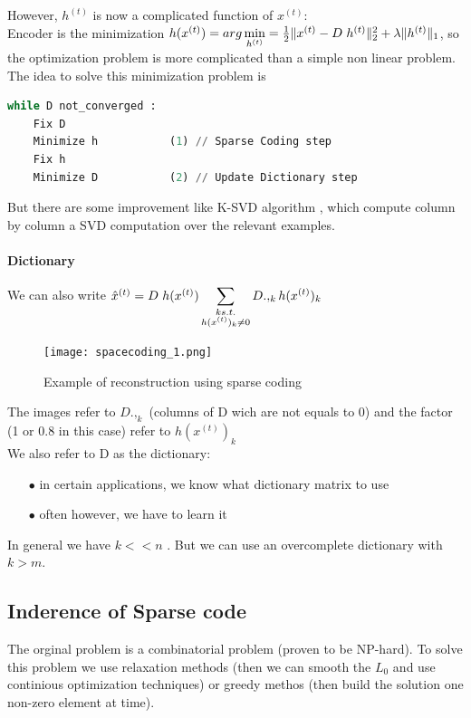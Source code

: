 \documentclass[a4paper,10pt]{article}
\begin{document}
However, $h^{(t)}$ is now a complicated function of $x^{(t)}$:\\
Encoder is the minimization $h(x^{(t)}) = arg\min\limits_{h^{(t)}}= \frac{1}{2} \| x^{(t)} - D \hspace{3px} h^{(t)} \|_2^2 + \lambda \|h^{(t)} \|_1$, so the optimization problem is more complicated than a simple non linear problem.\\
The idea to solve this minimization problem is \cite{NIPS2006_2979}

\begin{lstlisting}[language=Python,frame=single]
while D not_converged :
    Fix D
    Minimize h           (1) // Sparse Coding step
    Fix h 
    Minimize D           (2) // Update Dictionary step
\end{lstlisting}

But there are some improvement like K-SVD algorithm \cite{KSVD}, which compute column by column a SVD computation over the relevant examples.
\paragraph{Dictionary}
We can also write $\hat{x}^{(t)} = D\hspace{3px} h(x^{(t)}) \displaystyle\sum_{\substack{k s.t.\\ h(x^{(t)})_k\neq 0}}  D.,_k h(x^{(t)} )_k$
\begin{figure}[h]
 \centering
 \texttt{[image: spacecoding\_1.png]}
  \caption{Example of reconstruction using sparse coding}
\end{figure}

The images refer to $D.,_k$ (columns of D wich are not equals to 0) and the factor (1 or 0.8 in this case) refer to $h(x^{(t)} )_k$
\\We also refer to D as the dictionary:
\begin{itemize}
 \item[$\bullet$]in certain applications, we know what dictionary matrix to use
 \item[$\bullet$]often however, we have to learn it
\end{itemize}

In general we have $k<<n$ . But we can use an overcomplete dictionary with $k > m$.
\subsection{Inderence of Sparse code}
The orginal problem is a combinatorial problem (proven to be NP-hard). To solve this problem we use relaxation methods (then we can smooth the $L_0$ and use continious optimization techniques) or greedy methos (then build the solution one non-zero element at time).
\end{document}
